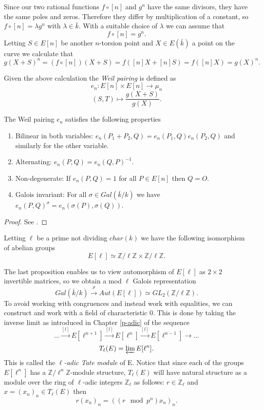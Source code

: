 Since our two rational functions $f \circ [n]$ and $g^n$ have the same divisors, they have the
same poles and zeros. Therefore they differ by multiplication of a constant, so
$f \circ [n] = \lambda g^n$ with $\lambda \in \bar{k}$. With a suitable choice of $\lambda$
we can assume that 
$$f \circ [n] = g^n.$$
Letting $S \in E[n]$ be another $n$-torsion point and $X \in E(\bar{k})$ a point on the curve we calculate that
$$ g(X + S)^n = (f \circ [n])(X + S) = f([n]X + [n]S) = f([n]X) = g(X)^n. $$
\begin{mydef}
 Given the above calculation the \emph{Weil pairing} is defined as
$$ e_n : E[n] \times E[n] \rightarrow \mu_n$$
$$ (S,T) \mapsto \frac{g(X + S)}{g(X)}. $$
\end{mydef}

\begin{prop}
 The Weil pairing $e_n$ satisfies the following properties
\begin{enumerate}
 \item Bilinear in both variables: $e_n(P_1 + P_2, Q) = e_n(P_1,Q)e_n(P_2,Q)$ and similarly for the other variable.
 \item Alternating: $e_n(P,Q) = e_n(Q,P)^{-1}$.
 \item Non-degenerate: If $e_n(P,Q) = 1$ for all $P \in E[n]$ then $Q=O$.
 \item Galois invariant: For all $\sigma \in Gal(\bar{k}/k)$ we have $e_n(P,Q)^\sigma = e_n(\sigma(P),\sigma(Q))$.
\end{enumerate}
\end{prop}
\begin{proof}
 See \cite{AEC}.
\end{proof}

\begin{prop}
Letting $\ell$ be a prime not dividing $char(k)$ we have the following isomorphism of abelian groups
 $$ E[\ell] \simeq \mathbb{Z}/\ell\mathbb{Z} \times \mathbb{Z}/\ell\mathbb{Z}. $$
\end{prop}

The last proposition enables us to view automorphism of $E[\ell]$ as $2\times 2$ invertible matrices,
so we obtain a  mod $\ell$ Galois representation
$$ Gal(\bar{k}/k) \overset{\rho}{\rightarrow} Aut(E[\ell]) \simeq GL_2(\mathbb{Z}/\ell\mathbb{Z}). $$
To avoid working with congruences and instead work with equalities, we can construct
and work with a field of characteristic 0. This is done by taking the inverse limit 
as introduced in Chapter \ref{p-adic} of the sequence
$$ \dots \overset{[l]}{\rightarrow} E[\ell^{n+1}] \overset{[l]}{\rightarrow} E[\ell^{n}] \overset{[l]}{\rightarrow} E[\ell^{n-1}] \rightarrow \ldots $$
$$ T_\ell(E) = \varprojlim E[\ell^n]. $$
This is called the \emph{$\ell$-adic Tate module} of E. Notice that since each of the groups $E[\ell^n]$ has a
$\mathbb{Z}/\ell^n\mathbb{Z}$-module structure, $T_\ell(E)$ will have natural structure as a module
over the ring of $\ell$-adic integers $\mathbb{Z}_\ell$ as follows: $r\in\mathbb{Z}_\ell$ and
$x=(x_n)_n\in T_\ell(E)$ then
$$ r(x_n)_n = ((r \mod p^n)x_n)_n.$$

